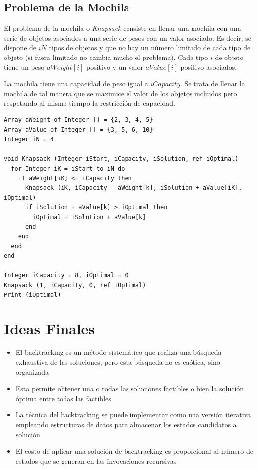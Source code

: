 

\subsection{Problema de la Mochila}

El problema de la mochila o \textit{Knapsack} consiste en llenar una mochila con una serie de objetos asociados a una serie de pesos con un valor asociado. Es decir, se dispone de $iN$ tipos de objetos y que no hay un número limitado de cada tipo de objeto (si fuera limitado no cambia mucho el problema). Cada tipo $i$ de objeto tiene un peso $aWeight[i]$ positivo y un valor $aValue[i]$ positivo asociados. 

La mochila tiene una capacidad de peso igual a $iCapacity$. Se trata de llenar la mochila de tal manera que se maximice el valor de los objetos incluidos pero respetando al mismo tiempo la restricción de capacidad. 

\begin{lstlisting}[upquote=true, language=pseudo]
Array aWeight of Integer [] = {2, 3, 4, 5}
Array aValue of Integer [] = {3, 5, 6, 10}
Integer iN = 4

void Knapsack (Integer iStart, iCapacity, iSolution, ref iOptimal)
  for Integer iK = iStart to iN do
    if aWeight[iK] <= iCapacity then
      Knapsack (iK, iCapacity - aWeight[k], iSolution + aValue[iK], iOptimal)
      if iSolution + aValue[k] > iOptimal then
        iOptimal = iSolution + aValue[k]
      end
    end
  end
end

Integer iCapacity = 8, iOptimal = 0
Knapsack (1, iCapacity, 0, ref iOptimal)
Print (iOptimal)
\end{lstlisting}

\section{Ideas Finales}

\begin{itemize}
\item El backtracking es un método sistemático que realiza una búsqueda exhaustiva de las soluciones, pero esta búsqueda no es caótica, sino organizada
\item Esta permite obtener una o todas las soluciones factibles o bien la solución óptima entre todas las factibles
\item La técnica del backtracking se puede implementar como una versión iterativa empleando estructuras de datos para almacenar los estados candidatos a solución
\item El costo de aplicar una solución de backtracking es proporcional al número de estados que se generan en las invocaciones recursivas
\end{itemize}

